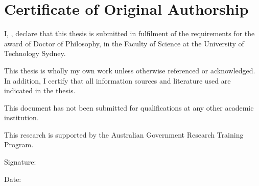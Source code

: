 \chapter*{Certificate of Original Authorship}

{
\setlength{\parskip}{1ex plus 0.5ex minus 0.2ex}
\setlength{\parindent}{0pt}

I, \makeatletter\@author\makeatother, declare that this thesis is submitted in fulfilment of the requirements for the award of Doctor of Philosophy, in the Faculty of Science at the University of Technology Sydney.

This thesis is wholly my own work unless otherwise referenced or acknowledged. In addition, I certify that all information sources and literature used are indicated in the thesis.

This document has not been submitted for qualifications at any other academic institution.

This research is supported by the Australian Government Research Training Program.

\vspace{6ex}

Signature:
	\hspace{.1em}

Date:
	 \@date\makeatother

}
